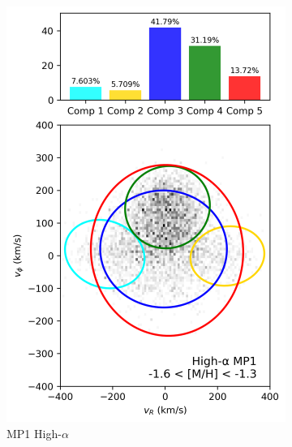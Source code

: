 \documentclass[a4paper,10pt]{article}
\begin{document}
\begin{multicols}{2}
\begin{figure}[H]
\begin{subfigure}[t]{0.24\linewidth}
    \includegraphics[width=\linewidth]{../figures/gmm_mp1_high_alpha_k5.png}
    \caption{MP1 High-$\alpha$}
  \end{subfigure}
  \hfill
  \begin{subfigure}[t]{0.24\linewidth}

\end{subfigure}
\end{figure}
\end{multicols}
\end{document}
